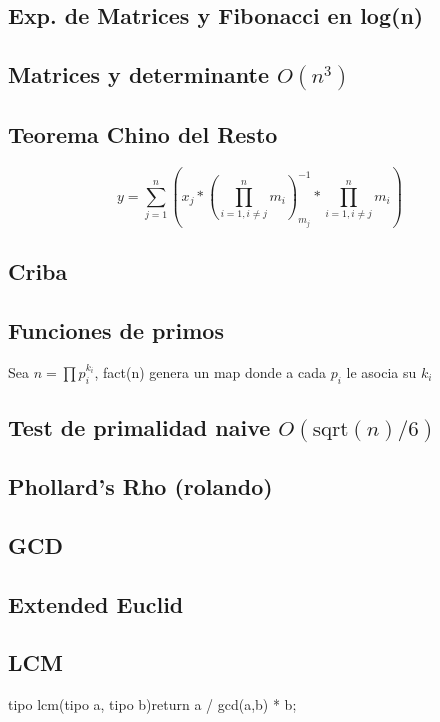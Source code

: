 \subsection{Exp. de Matrices y Fibonacci en log(n)}
\subsection{Matrices y determinante $O(n^3)$}
\subsection{Teorema Chino del Resto}
$$y=\sum_{j=1}^n (x_j*(\prod_{i=1, i\neq j}^n m_i)_{m_j}^{-1}*\prod_{i=1, i\neq j}^n m_i)$$
\subsection{Criba}
\subsection{Funciones de primos}
Sea $n=\prod{p_i^{k_i}}$, fact(n) genera un map donde a cada $p_i$ le asocia su $k_i$
\subsection{Test de primalidad naive $O\left(\textrm{sqrt}(n)/6\right)$}
\subsection{Phollard's Rho (rolando)}
\subsection{GCD}
\subsection{Extended Euclid}
\subsection{LCM}
\begin{code}
tipo lcm(tipo a, tipo b){return a / gcd(a,b) * b;}
\end{code}
